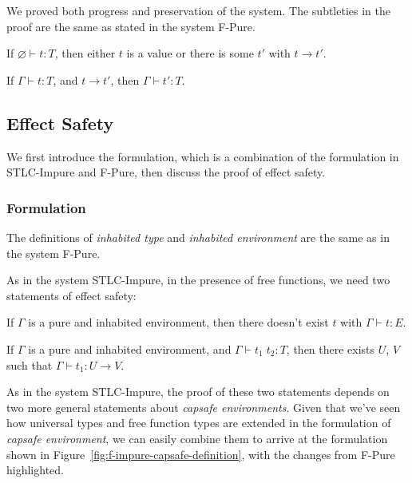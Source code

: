 We proved both progress and preservation of the system. The subtleties
in the proof are the same as stated in the system F-Pure.

\begin{theorem}[Progress]
If $\varnothing \vdash t : T$, then either $t$ is a value or there is some
$t'$ with $t \longrightarrow t'$.
\end{theorem}

\begin{theorem}[Preservation]
If $\Gamma \vdash t : T$, and $t \longrightarrow t'$, then $\Gamma
\vdash t' : T$.
\end{theorem}

\subsection{Effect Safety}

We first introduce the formulation, which is a combination of the
formulation in STLC-Impure and F-Pure, then discuss the proof of
effect safety.

\subsubsection{Formulation}

The definitions of \emph{inhabited type} and \emph{inhabited
  environment} are the same as in the system F-Pure.

As in the system STLC-Impure, in the presence of free functions, we
need two statements of effect safety:

\begin{definition}
  If $\Gamma$ is a pure and inhabited environment, then there
  doesn't exist $t$ with $\Gamma \vdash t : E$.
\end{definition}

\begin{definition}
  If $\Gamma$ is a pure and inhabited environment, and
  $\Gamma \vdash t_1 \; t_2 : T$, then there exists $U$, $V$ such that
  $\Gamma \vdash t_1 : U \to V$.
\end{definition}

As in the system STLC-Impure, the proof of these two statements
depends on two more general statements about \emph{capsafe
  environments}. Given that we've seen how universal types and free
function types are extended in the formulation of \emph{capsafe
  environment}, we can easily combine them to arrive at the
formulation shown in Figure~\ref{fig:f-impure-capsafe-definition},
with the changes from F-Pure highlighted.

